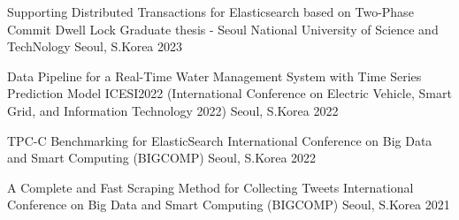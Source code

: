 



\begin{cvhonors}

  \cvhonor
    {Supporting Distributed Transactions for Elasticsearch based on Two-Phase Commit Dwell Lock} %
    {Graduate thesis - Seoul National University of Science and TechNology} %
    {Seoul, S.Korea} %
    {2023} %

\end{cvhonors}




\begin{cvhonors}
  \cvhonor
    {Data Pipeline for a Real-Time Water Management System with Time Series Prediction Model} %
    {ICESI2022 (International Conference on Electric Vehicle, Smart Grid, and Information Technology 2022)} %
    {Seoul, S.Korea} %
    {2022} %

  \cvhonor
    {TPC-C Benchmarking for ElasticSearch} %
    {International Conference on Big Data and Smart Computing (BIGCOMP)} %
    {Seoul, S.Korea} %
    {2022} %

  \cvhonor
    {A Complete and Fast Scraping Method for Collecting Tweets} %
    {International Conference on Big Data and Smart Computing (BIGCOMP)} %
    {Seoul, S.Korea} %
    {2021} %


\end{cvhonors}
